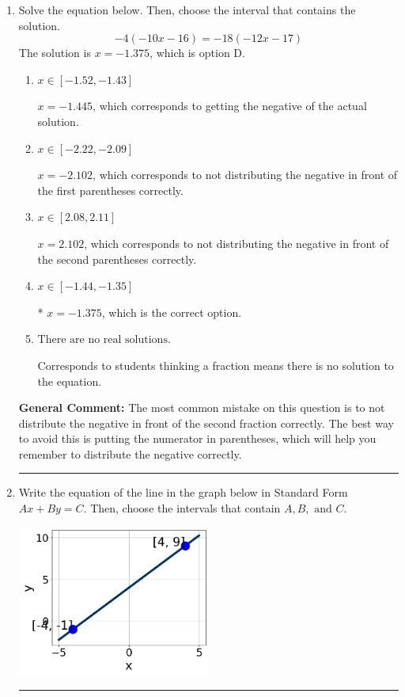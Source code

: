 \documentclass{extbook}[14pt]
\newcommand{\litem}[1]{\item #1

\rule{\textwidth}{0.4pt}}
\begin{document}
\begin{enumerate}\litem{
Solve the equation below. Then, choose the interval that contains the solution.
\[ -4(-10x -16) = -18(-12x -17) \]The solution is \( x = -1.375 \), which is option D.\begin{enumerate}[label=\Alph*.]
\item \( x \in [-1.52, -1.43] \)

$x = -1.445$, which corresponds to getting the negative of the actual solution.
\item \( x \in [-2.22, -2.09] \)

$x = -2.102$, which corresponds to not distributing the negative in front of the first parentheses correctly.
\item \( x \in [2.08, 2.11] \)

$x = 2.102$, which corresponds to not distributing the negative in front of the second parentheses correctly.
\item \( x \in [-1.44, -1.35] \)

* $x = -1.375$, which is the correct option.
\item \( \text{There are no real solutions.} \)

Corresponds to students thinking a fraction means there is no solution to the equation.
\end{enumerate}

\textbf{General Comment:} The most common mistake on this question is to not distribute the negative in front of the second fraction correctly. The best way to avoid this is putting the numerator in parentheses, which will help you remember to distribute the negative correctly.
}
\litem{
Write the equation of the line in the graph below in Standard Form $Ax+By=C$. Then, choose the intervals that contain $A, B, \text{ and } C$.

\begin{center}
    \includegraphics[width=0.5\textwidth]{../Figures/linearGraphToStandardCopyB.png}
\end{center}


}
\end{enumerate}
\end{document}
